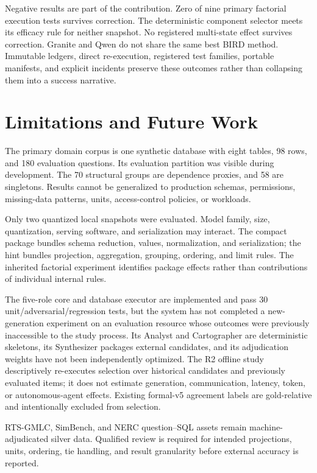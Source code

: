 \documentclass[applsci,article,submit,moreauthors]{Definitions/mdpi}
\begin{document}
Negative results are part of the contribution. Zero of nine primary factorial execution tests survives correction. The deterministic component selector meets its efficacy rule for neither snapshot. No registered multi-state effect survives correction. Granite and Qwen do not share the same best BIRD method. Immutable ledgers, direct re-execution, registered test families, portable manifests, and explicit incidents preserve these outcomes rather than collapsing them into a success narrative.

\section{Limitations and Future Work}

The primary domain corpus is one synthetic database with eight tables, 98 rows, and 180 evaluation questions. Its evaluation partition was visible during development. The 70 structural groups are dependence proxies, and 58 are singletons. Results cannot be generalized to production schemas, permissions, missing-data patterns, units, access-control policies, or workloads.

Only two quantized local snapshots were evaluated. Model family, size, quantization, serving software, and serialization may interact. The compact package bundles schema reduction, values, normalization, and serialization; the hint bundles projection, aggregation, grouping, ordering, and limit rules. The inherited factorial experiment identifies package effects rather than contributions of individual internal rules.

The five-role core and database executor are implemented and pass 30 unit/adversarial/regression tests, but the system has not completed a new-generation experiment on an evaluation resource whose outcomes were previously inaccessible to the study process. Its Analyst and Cartographer are deterministic skeletons, its Synthesizer packages external candidates, and its adjudication weights have not been independently optimized. The R2 offline study descriptively re-executes selection over historical candidates and previously evaluated items; it does not estimate generation, communication, latency, token, or autonomous-agent effects. Existing formal-v5 agreement labels are gold-relative and intentionally excluded from selection.

RTS-GMLC, SimBench, and NERC question--SQL assets remain machine-adjudicated silver data. Qualified review is required for intended projections, units, ordering, tie handling, and result granularity before external accuracy is reported.
\end{document}
